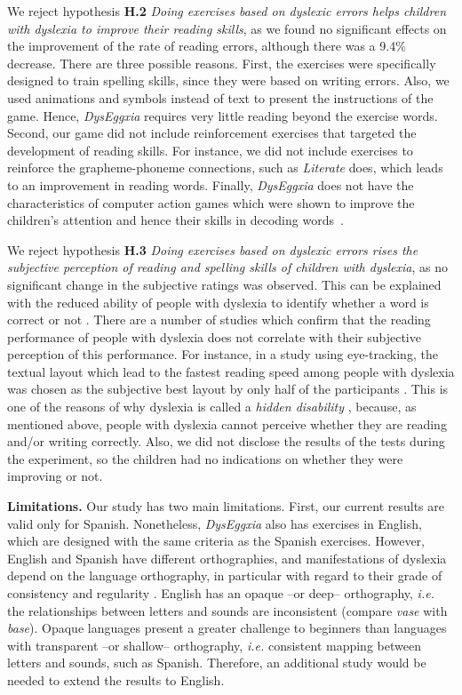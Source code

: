 \documentclass[letterpaper]{sig-alternate-2013}
\begin{document}
We reject hypothesis {\bf H.2} {\it Doing exercises based on dyslexic errors helps children with dyslexia to improve their reading skills}, as we found no significant effects on the improvement of the rate of reading errors, although there was a 9.4\% decrease. There are three possible reasons. First, the exercises were specifically designed to train spelling skills, since they were based on writing errors. Also, we used animations and symbols instead of text to present the instructions of the game. Hence, {\it DysEggxia} requires very little reading beyond the exercise words. 
Second, our game did not include reinforcement exercises that targeted the development of reading skills. For instance, we did not include exercises to reinforce the grapheme-phoneme connections, such as {\it Literate} \cite{Lyytinen2007} does, which leads to an improvement in reading words. 
Finally, {\it DysEggxia} does not have the characteristics of computer action games which were shown to improve the children's attention and hence their skills in decoding words~\cite{Franceschini2013}. 







We reject hypothesis {\bf H.3} {\it Doing exercises based on dyslexic errors rises the subjective perception of reading and spelling skills of children with dyslexia}, as no significant change in the subjective ratings was observed.
This can be explained with the reduced ability of people with dyslexia to identify whether a word is correct or not \cite{Bruck1988,WWW2012}.
There are a number of studies which confirm that the reading performance of people with dyslexia does not correlate with their subjective perception of this performance. For instance, in a study using eye-tracking, the textual layout which lead to the fastest reading speed among people with dyslexia was chosen as the subjective best layout by only half of the participants \cite{W4A2012}. This is one of the reasons of why dyslexia is called a {\it hidden disability} \cite{Lyon2003}, because, as mentioned above, people with dyslexia cannot perceive whether they are reading and/or writing correctly. Also, we did not disclose the results of the tests during the experiment, so the children had no indications on whether they were improving or not.

{\bf Limitations.} Our study has two main limitations. First, our current results are valid only for Spanish. Nonetheless, {\it DysEggxia} also has  exercises in English, which are designed with the same criteria as the Spanish exercises. However, English and Spanish have different orthographies, and manifestations of dyslexia depend on the language orthography, in particular with regard to their grade of consistency and regularity \cite{Brunswick2010}.
English has an opaque --or deep-- orthography, \emph{i.e.} the relationships between letters and sounds are inconsistent (compare {\it vase} with {\it base}). 
Opaque languages present a greater challenge to beginners than languages with transparent --or shallow-- orthography, \emph{i.e.} consistent mapping between letters and sounds, such as Spanish.
Therefore, an additional study would be needed to extend the results to English. 
\end{document}
